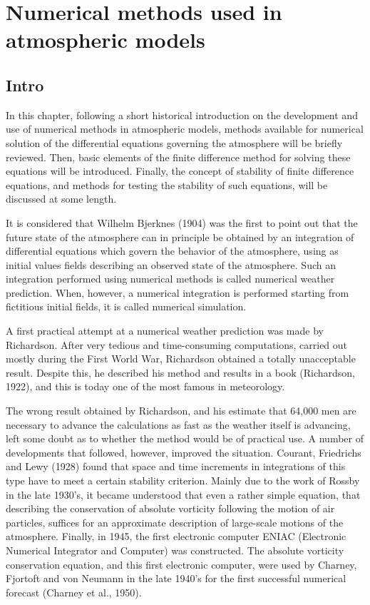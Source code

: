\chapter{Numerical methods used in atmospheric models}

\section{Intro}
In this chapter, following a short historical introduction on the development and use of numerical methods in atmospheric models, methods available for numerical solution of the differential equations governing the atmosphere will be briefly reviewed. Then, basic elements of the finite difference method for solving these equations will be introduced. Finally, the concept of stability of finite difference equations, and methods for testing the stability of such equations, will be discussed at some length.

It is considered that Wilhelm Bjerknes (1904) was the first to point out that the future state of the atmosphere can in principle be obtained by an integration of differential equations which govern the behavior of the atmosphere, using as initial values fields describing an observed state of the atmosphere. Such an integration performed using numerical methods is called numerical weather prediction. When, however, a numerical integration is performed starting from fictitious initial fields, it is called numerical simulation.

A first practical attempt at a numerical weather prediction was made by Richardson. After very tedious and time-consuming computations, carried out mostly during the First World War, Richardson obtained a totally unacceptable result. Despite this, he described his method and results in a book (Richardson, 1922), and this is today one of the most famous in meteorology.

The wrong result obtained by Richardson, and his estimate that 64,000 men are necessary to advance the calculations as fast as the weather itself is advancing, left some doubt as to whether the method would be of practical use. A number of developments that followed, however, improved the situation. Courant, Friedrichs and Lewy (1928) found that space and time increments in integrations of this type have to meet a certain stability criterion. Mainly due to the work of Rossby in the late 1930’s, it became understood that even a rather simple equation, that describing the conservation of absolute vorticity following the motion of air particles, suffices for an approximate description of large-scale motions of the atmosphere. Finally, in 1945, the first electronic computer ENIAC (Electronic Numerical Integrator and Computer) was constructed. The absolute vorticity conservation equation, and this first electronic computer, were used by Charney, Fjortoft and von Neumann in the late 1940’s for the first successful numerical forecast (Charney et al., 1950).

